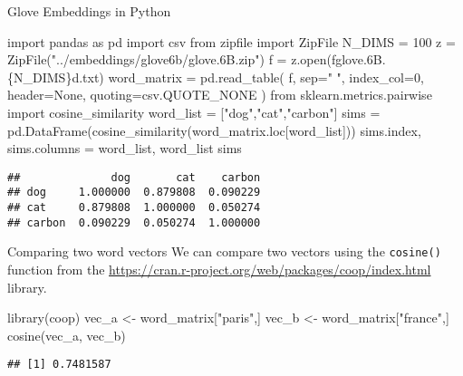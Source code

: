 \documentclass[
  10pt,
  ignorenonframetext,
  aspectratio=169]{beamer}
\newenvironment{Shaded}{\begin{snugshade}}{\end{snugshade}}
\newcommand{\BuiltInTok}[1]{\textcolor[rgb]{0.80,0.80,0.80}{#1}}
\newcommand{\DecValTok}[1]{\textcolor[rgb]{0.86,0.86,0.80}{#1}}
\newcommand{\FunctionTok}[1]{\textcolor[rgb]{0.94,0.94,0.56}{#1}}
\newcommand{\ImportTok}[1]{\textcolor[rgb]{0.80,0.80,0.80}{#1}}
\newcommand{\NormalTok}[1]{\textcolor[rgb]{0.80,0.80,0.80}{#1}}
\newcommand{\OperatorTok}[1]{\textcolor[rgb]{0.94,0.94,0.82}{#1}}
\newcommand{\OtherTok}[1]{\textcolor[rgb]{0.94,0.94,0.56}{#1}}
\newcommand{\SpecialCharTok}[1]{\textcolor[rgb]{0.86,0.64,0.64}{#1}}
\newcommand{\SpecialStringTok}[1]{\textcolor[rgb]{0.80,0.58,0.58}{#1}}
\newcommand{\StringTok}[1]{\textcolor[rgb]{0.80,0.58,0.58}{#1}}
\newcommand{\VariableTok}[1]{\textcolor[rgb]{0.80,0.80,0.80}{#1}}
\begin{document}
\begin{frame}[fragile]{Glove Embeddings in Python}
\protect\hypertarget{glove-embeddings-in-python}{}
\scriptsize

\begin{Shaded}
\begin{Highlighting}[]
\ImportTok{import}\NormalTok{ pandas }\ImportTok{as}\NormalTok{ pd}
\ImportTok{import}\NormalTok{ csv}
\ImportTok{from}\NormalTok{ zipfile }\ImportTok{import}\NormalTok{ ZipFile}
\NormalTok{N\_DIMS }\OperatorTok{=} \DecValTok{100}
\NormalTok{z }\OperatorTok{=}\NormalTok{ ZipFile(}\StringTok{"../embeddings/glove6b/glove.6B.zip"}\NormalTok{)}
\NormalTok{f }\OperatorTok{=}\NormalTok{ z.}\BuiltInTok{open}\NormalTok{(}\SpecialStringTok{f\textquotesingle{}glove.6B.}\SpecialCharTok{\{}\NormalTok{N\_DIMS}\SpecialCharTok{\}}\SpecialStringTok{d.txt\textquotesingle{}}\NormalTok{)}
\NormalTok{word\_matrix }\OperatorTok{=}\NormalTok{ pd.read\_table(}
\NormalTok{    f, sep}\OperatorTok{=}\StringTok{" "}\NormalTok{, index\_col}\OperatorTok{=}\DecValTok{0}\NormalTok{, }
\NormalTok{    header}\OperatorTok{=}\VariableTok{None}\NormalTok{, quoting}\OperatorTok{=}\NormalTok{csv.QUOTE\_NONE}
\NormalTok{)}
\ImportTok{from}\NormalTok{ sklearn.metrics.pairwise }\ImportTok{import}\NormalTok{ cosine\_similarity}
\NormalTok{word\_list }\OperatorTok{=}\NormalTok{ [}\StringTok{"dog"}\NormalTok{,}\StringTok{"cat"}\NormalTok{,}\StringTok{"carbon"}\NormalTok{]}
\NormalTok{sims }\OperatorTok{=}\NormalTok{ pd.DataFrame(cosine\_similarity(word\_matrix.loc[word\_list]))}
\NormalTok{sims.index, sims.columns }\OperatorTok{=}\NormalTok{ word\_list, word\_list}
\NormalTok{sims}
\end{Highlighting}
\end{Shaded}

\begin{verbatim}
##              dog       cat    carbon
## dog     1.000000  0.879808  0.090229
## cat     0.879808  1.000000  0.050274
## carbon  0.090229  0.050274  1.000000
\end{verbatim}
\end{frame}

\begin{frame}[fragile]{Comparing two word vectors}
\protect\hypertarget{comparing-two-word-vectors}{}
We can compare two vectors using the \texttt{cosine()} function from the
\href{coop}{https://cran.r-project.org/web/packages/coop/index.html}
library.

\medskip

\begin{Shaded}
\begin{Highlighting}[]
\FunctionTok{library}\NormalTok{(coop)}
\NormalTok{vec\_a }\OtherTok{\textless{}{-}}\NormalTok{ word\_matrix[}\StringTok{"paris"}\NormalTok{,] }
\NormalTok{vec\_b }\OtherTok{\textless{}{-}}\NormalTok{ word\_matrix[}\StringTok{"france"}\NormalTok{,] }
\FunctionTok{cosine}\NormalTok{(vec\_a, vec\_b)}
\end{Highlighting}
\end{Shaded}

\begin{verbatim}
## [1] 0.7481587
\end{verbatim}
\end{frame}
\end{document}
